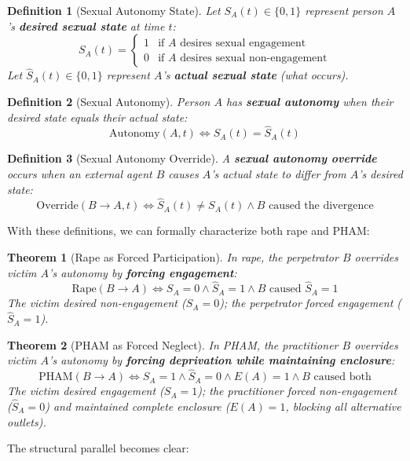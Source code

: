 \documentclass[12pt, letterpaper]{article}
\newtheorem{definition}{Definition}[section]
\newtheorem{theorem}{Theorem}[section]
\begin{document}
\begin{definition}[Sexual Autonomy State]
Let $S_A(t) \in \{0, 1\}$ represent person $A$'s \textbf{desired sexual state} at time $t$:
\[
S_A(t) = \begin{cases}
1 & \text{if } A \text{ desires sexual engagement} \\
0 & \text{if } A \text{ desires sexual non-engagement}
\end{cases}
\]
Let $\hat{S}_A(t) \in \{0, 1\}$ represent $A$'s \textbf{actual sexual state} (what occurs).
\end{definition}

\begin{definition}[Sexual Autonomy]
Person $A$ has \textbf{sexual autonomy} when their desired state equals their actual state:
\[
\text{Autonomy}(A, t) \iff S_A(t) = \hat{S}_A(t)
\]
\end{definition}

\begin{definition}[Sexual Autonomy Override]
A \textbf{sexual autonomy override} occurs when an external agent $B$ causes $A$'s actual state to differ from $A$'s desired state:
\[
\text{Override}(B \rightarrow A, t) \iff \hat{S}_A(t) \neq S_A(t) \land B \text{ caused the divergence}
\]
\end{definition}

With these definitions, we can formally characterize both rape and PHAM:

\begin{theorem}[Rape as Forced Participation]
In rape, the perpetrator $B$ overrides victim $A$'s autonomy by \textbf{forcing engagement}:
\[
\text{Rape}(B \rightarrow A) \iff S_A = 0 \land \hat{S}_A = 1 \land B \text{ caused } \hat{S}_A = 1
\]
The victim desired non-engagement ($S_A = 0$); the perpetrator forced engagement ($\hat{S}_A = 1$).
\end{theorem}

\begin{theorem}[PHAM as Forced Neglect]
In PHAM, the practitioner $B$ overrides victim $A$'s autonomy by \textbf{forcing deprivation while maintaining enclosure}:
\[
\text{PHAM}(B \rightarrow A) \iff S_A = 1 \land \hat{S}_A = 0 \land E(A) = 1 \land B \text{ caused both}
\]
The victim desired engagement ($S_A = 1$); the practitioner forced non-engagement ($\hat{S}_A = 0$) \textit{and} maintained complete enclosure ($E(A) = 1$, blocking all alternative outlets).
\end{theorem}

The structural parallel becomes clear:
\end{document}

